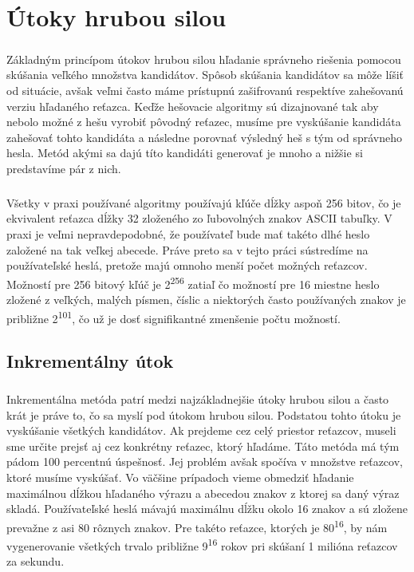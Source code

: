 \chapter{Útoky hrubou silou}
\paragraph{}
Základným princípom útokov hrubou silou hľadanie správneho riešenia pomocou skúšania veľkého množstva kandidátov. Spôsob skúšania kandidátov sa môže líšiť od situácie, avšak veľmi často máme prístupnú zašifrovanú respektíve zahešovanú verziu hľadaného reťazca. Keďže hešovacie algoritmy sú dizajnované tak aby nebolo možné z hešu vyrobiť pôvodný reťazec, musíme pre vyskúšanie kandidáta zahešovať tohto kandidáta a následne porovnať výsledný heš s tým od správneho hesla. Metód akými sa dajú títo kandidáti generovať je mnoho a nižšie si predstavíme pár z nich.

\paragraph{}
Všetky v praxi používané algoritmy používajú kľúče dĺžky aspoň 256 bitov, čo je ekvivalent reťazca dĺžky 32 zloženého zo ľubovolných znakov ASCII tabuľky. V praxi je veľmi nepravdepodobné, že používateľ bude mať takéto dlhé heslo založené na tak veľkej abecede. Práve preto sa v tejto práci sústredíme na používateľské heslá, pretože majú omnoho menší počet možných reťazcov. Možností pre 256 bitový kľúč je 2\textsuperscript{256} zatiaľ čo možností pre 16 miestne heslo zložené z veľkých, malých písmen, číslic a niektorých často používaných znakov je približne 2\textsuperscript{101}, čo už je dosť signifikantné zmenšenie počtu možností.

\section{Inkrementálny útok}
\paragraph{}
Inkrementálna metóda patrí medzi najzákladnejšie útoky hrubou silou a často krát je práve to, čo sa myslí pod útokom hrubou silou. Podstatou tohto útoku je vyskúšanie všetkých kandidátov. Ak prejdeme cez celý priestor reťazcov, museli sme určite prejsť aj cez konkrétny reťazec, ktorý hľadáme. Táto metóda má tým pádom 100 percentnú úspešnosť. Jej problém avšak spočíva v množstve reťazcov, ktoré musíme vyskúšať. Vo väčšine prípadoch vieme obmedziť hľadanie maximálnou dĺžkou hľadaného výrazu a abecedou znakov z ktorej sa daný výraz skladá. Používateľské heslá mávajú maximálnu dĺžku okolo 16 znakov a sú zložene prevažne z asi 80 rôznych znakov. Pre takéto reťazce, ktorých je 80\textsuperscript{16}, by nám vygenerovanie všetkých trvalo približne 9\textsuperscript{16} rokov pri skúšaní 1 milióna reťazcov za sekundu.

